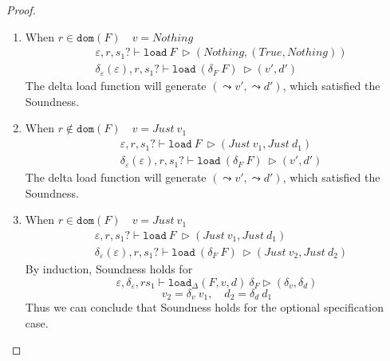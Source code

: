 \documentclass[10pt,twoside,a4paper]{article}
\theoremstyle{theorem}
\theoremstyle{lemma}
\theoremstyle{property}
\theoremstyle{definition}
\theoremstyle{assumption}
\def\newenv{\delta_\varepsilon(\varepsilon)}
\begin{document}
\begin{proof}
\begin{enumerate}
	\item
	When $r \in \mathtt{dom}(F) \quad v = Nothing$
	\begin{align*}
		& \varepsilon, r, s_1? \vdash \mathtt{load}~ F~ \rhd (Nothing,(True, Nothing))\\
		& \newenv, r, s_1? \vdash \mathtt{load}~ (\delta_F~F)~ \rhd (v', d')
	\end{align*}
	The delta load function will generate $(\leadsto v', \leadsto d')$, which satisfied the Soundness.

	\item
	When $r \notin \mathtt{dom}(F) \quad v = Just~ v_1$
	\begin{align*}
		& \varepsilon, r, s_1? \vdash \mathtt{load}~ F~ \rhd (Just ~v_1, Just ~d_1)\\
		& \newenv, r, s_1? \vdash \mathtt{load}~ (\delta_F~F)~ \rhd (v', d')
	\end{align*}
	The delta load function will generate $(\leadsto v', \leadsto d')$, which satisfied the Soundness.

	\item
	When $r \in \mathtt{dom}(F) \quad v = Just~ v_1$
	\begin{align*}
		& \varepsilon, r, s_1? \vdash \mathtt{load}~ F~ \rhd (Just ~v_1, Just ~d_1)\\
		& \newenv, r, s_1? \vdash \mathtt{load}~ (\delta_F~F)~ \rhd (Just ~v_2, Just ~d_2)
	\end{align*}
	By induction, Soundness holds for
	\begin{displaymath}
		\varepsilon, \delta_\varepsilon, r s_1 \vdash \mathtt{load}_\Delta (F,v,d)~ \delta_F \rhd (\delta_v,\delta_d)
	\end{displaymath}
	\begin{displaymath}
		v_2 = \delta_v ~ v_1, \quad d_2 = \delta_d ~ d_1
	\end{displaymath}
	Thus we can conclude that Soundness holds for the optional specification case.
	\end{enumerate}


\end{proof}
\end{document}
